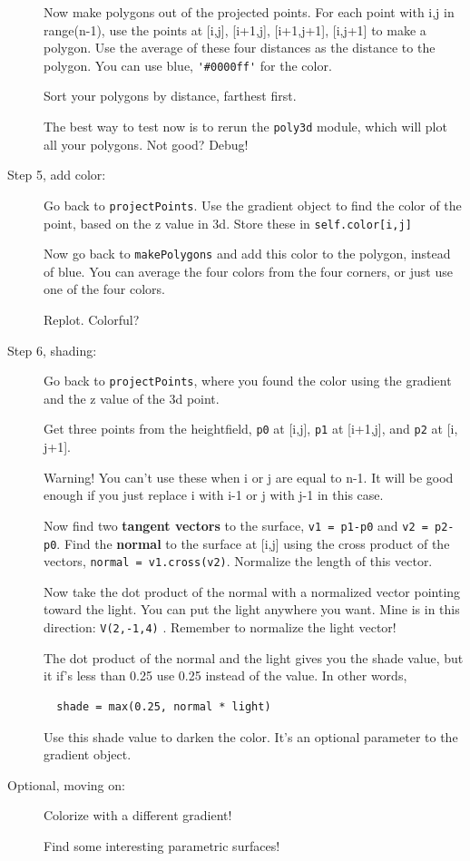 \documentclass[12pt]{article}
\begin{document}
\begin{description}
Now make polygons out of the projected points.
For each point with i,j in range(n-1), use the points
at [i,j], [i+1,j], [i+1,j+1], [i,j+1] to make a polygon.
Use the average of these four distances as the
distance to the polygon.  You can use blue, \lstinline{'#0000ff'}
for the color.

Sort your polygons by distance, farthest first.

The best way to test now is to rerun the \lstinline{poly3d}
module, which will plot all your polygons.  Not good?  Debug!

\item[Step 5, add color:] Go back to  \lstinline{projectPoints}.
 Use the gradient object to find the color
of the point, based on the z value in 3d.  Store these in
\lstinline{self.color[i,j]}  

Now go back to \lstinline{makePolygons}  and 
add this color to the polygon, instead of blue.
You can average the four colors from the four corners,
or just use one of the four colors.

Replot. Colorful?

\item[Step 6, shading:] Go back to \lstinline{projectPoints}, where you
found the color using the gradient and the z value of the 3d point.

Get three points from the heightfield, \lstinline{p0} at [i,j], \lstinline{p1} at [i+1,j],
and \lstinline{p2} at [i, j+1].

Warning!  You can't use these when i or j are equal to n-1.  It will be
good enough if you just replace i with i-1 or j with j-1 in this case.

Now find two {\bf tangent vectors} to the surface, \lstinline{v1 = p1-p0}
and \lstinline{v2 = p2-p0}.
Find the {\bf normal} to the surface at [i,j] using the cross
product of the vectors, \lstinline{normal = v1.cross(v2)}. 
Normalize the length of this vector.

Now take the dot product of the normal with
a normalized vector pointing toward the light.
You can put the light anywhere you want.  Mine is in
this direction: \lstinline{V(2,-1,4)} .  Remember to normalize
the light vector!

The dot product of the normal and the light gives you the shade value,
but it if's less than 0.25 use 0.25 instead of the value.  In other words,
\begin{lstlisting}
  shade = max(0.25, normal * light)
\end{lstlisting}

Use this shade value to darken the color.  It's an optional parameter
to the gradient object.

\item[Optional, moving on:]
Colorize with a different gradient!

Find some interesting parametric surfaces!

\end{description}
\end{document}
